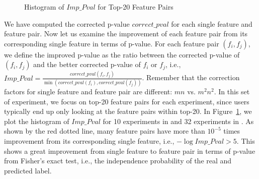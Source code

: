 \begin{figure}[h]
\centering     %
\vspace{-3mm}
\vspace{-5mm}
\caption{Histogram of $Imp\_Pval$ for Top-20 Feature Pairs}
\vspace{-5mm}
\label{fig:histogram_diff}
\end{figure}


 We have computed the corrected p-value $correct\_pval$ for each single feature and feature pair. Now let us examine the improvement of each feature pair from its corresponding single feature in terms of p-value. For each feature pair $(f_i,f_j)$, we define the improved p-value as the ratio between the corrected p-value of $(f_i,f_j)$ and the better corrected p-value of $f_i$ or $f_j$, i.e., $Imp\_Pval = \frac{correct\_pval(f_i,f_j)}{\min(correct\_pval(f_i),correct\_pval(f_j))}$. Remember that the correction factors for single feature and feature pair are different: $mn$ vs. $m^2n^2$. In this set of experiment, we focus on top-20 feature pairs for each experiment, since users typically end up only looking at the feature pairs within top-20. In Figure~\ref{fig:histogram_diff}, we plot the histogram of $Imp\_Pval$ for 10 experiments in \msig and 32 experiments in \lincs. As shown by the red dotted line, many feature pairs have more than $10^{-5}$ times improvement from its corresponding single feature, i.e., $-\log Imp\_Pval > 5$. This shows a great improvement from single feature to feature pair in terms of p-value from Fisher's exact test, i.e., the independence probability of the real and predicted label.





